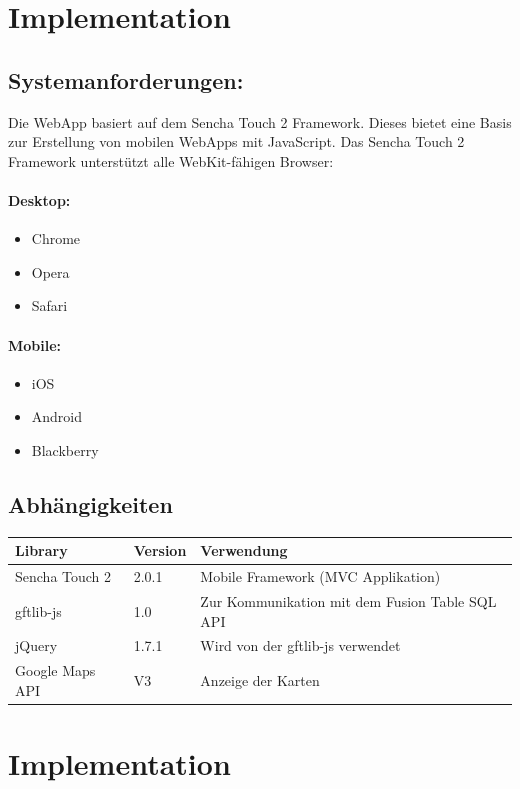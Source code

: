 \section{Implementation}
\subsection{Systemanforderungen:}
Die WebApp basiert auf dem Sencha Touch 2 Framework. Dieses bietet eine Basis zur Erstellung von mobilen WebApps mit JavaScript. Das Sencha Touch 2 Framework unterstützt alle WebKit-fähigen Browser:

\paragraph{Desktop:}
\begin{itemize}
\item Chrome
\item Opera
\item Safari
\end{itemize}

\paragraph{Mobile:}
\begin{itemize}
\item iOS
\item Android
\item Blackberry
\end{itemize}

\subsection{Abhängigkeiten}
\begin{tabular}{|l|l|p{10cm}|}
\hline 
\textbf{Library} & \textbf{Version} & \textbf{Verwendung} \\ 
\hline 
Sencha Touch 2 & 2.0.1 & Mobile Framework (MVC Applikation) \\ 
\hline 
gftlib-js & 1.0 & Zur Kommunikation mit dem Fusion Table SQL API \\ 
\hline 
jQuery & 1.7.1 & Wird von der gftlib-js verwendet \\ 
\hline 
Google Maps API & V3 & Anzeige der Karten \\ 
\hline 
\end{tabular} 

\section{Implementation}
